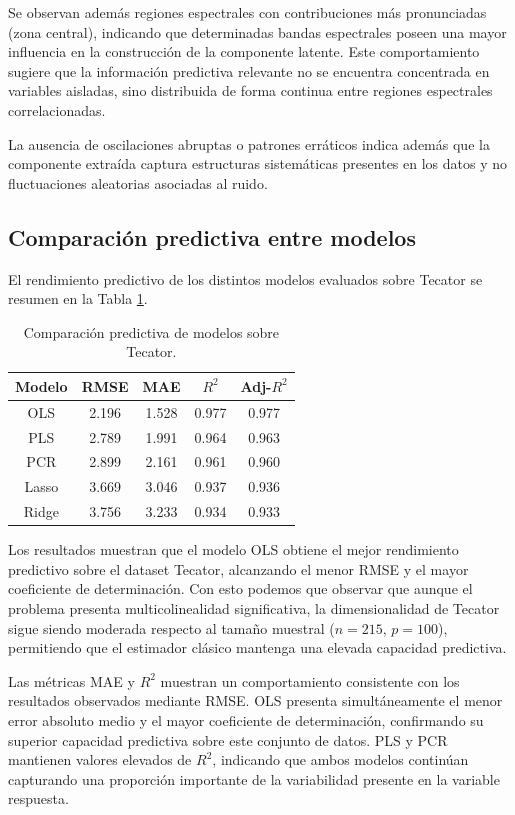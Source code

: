 \documentclass[12pt,a4paper]{report}
\begin{document}
Se observan además regiones espectrales con contribuciones más pronunciadas (zona central), indicando que determinadas bandas espectrales poseen una mayor influencia en la construcción de la componente latente. Este comportamiento sugiere que la información predictiva relevante no se encuentra concentrada en variables aisladas, sino distribuida de forma continua entre regiones espectrales correlacionadas.

La ausencia de oscilaciones abruptas o patrones erráticos indica además que la componente extraída captura estructuras sistemáticas presentes en los datos y no fluctuaciones aleatorias asociadas al ruido.

\subsection{Comparación predictiva entre modelos}

El rendimiento predictivo de los distintos modelos evaluados sobre Tecator se resumen en la Tabla \ref{tab:tecator_results}.

\begin{table}[H]
\centering
\small
\caption{Comparación predictiva de modelos sobre Tecator.}
\label{tab:tecator_results}
\begin{tabular}{|c|c|c|c|c|}
\hline
\textbf{Modelo} & \textbf{RMSE} & \textbf{MAE} & \textbf{$R^2$} & \textbf{Adj-$R^2$} \\
\hline \hline
OLS    & 2.196 & 1.528 & 0.977 & 0.977 \\ \hline
PLS    & 2.789 & 1.991 & 0.964 & 0.963 \\ \hline
PCR    & 2.899 & 2.161 & 0.961 & 0.960 \\ \hline
Lasso  & 3.669 & 3.046 & 0.937 & 0.936 \\ \hline
Ridge  & 3.756 & 3.233 & 0.934 & 0.933 \\ \hline
\end{tabular}
\end{table}

Los resultados muestran que el modelo OLS obtiene el mejor rendimiento predictivo sobre el dataset Tecator, alcanzando el menor RMSE y el mayor coeficiente de determinación. Con esto podemos que observar que aunque el problema presenta multicolinealidad significativa, la dimensionalidad de Tecator sigue siendo moderada respecto al tamaño muestral ($n=215$, $p=100$), permitiendo que el estimador clásico mantenga una elevada capacidad predictiva.

Las métricas MAE y $R^2$ muestran un comportamiento consistente con los resultados observados mediante RMSE. OLS presenta simultáneamente el menor error absoluto medio y el mayor coeficiente de determinación, confirmando su superior capacidad predictiva sobre este conjunto de datos. PLS y PCR mantienen valores elevados de $R^2$, indicando que ambos modelos continúan capturando una proporción importante de la variabilidad presente en la variable respuesta.
\end{document}
